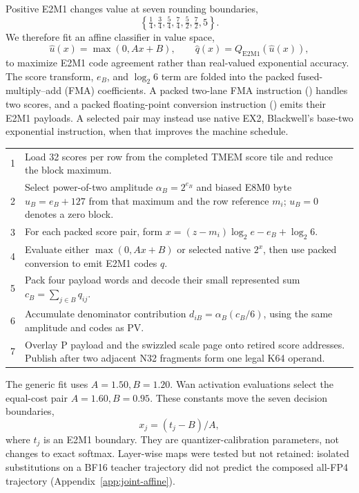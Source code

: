 Positive E2M1 changes value at seven rounding boundaries,
\begin{equation}
  \left\{\tfrac14,\tfrac34,\tfrac54,\tfrac74,
  \tfrac52,\tfrac72,5\right\}.
  \label{eq:e2m1-boundaries}
\end{equation}
We therefore fit an affine classifier in value space,
\begin{equation}
  \widehat u(x)=\max(0,Ax+B),\qquad
  \widehat q(x)=Q_{\mathrm{E2M1}}(\widehat u(x)),
  \label{eq:affine-code-map}
\end{equation}
to maximize E2M1 code agreement rather than real-valued exponential
accuracy. The score transform, $e_B$, and $\log_2 6$ term are folded into the
packed fused-multiply--add (FMA) coefficients. A packed two-lane FMA
instruction () handles two scores, and a packed floating-point
conversion instruction () emits their E2M1 payloads. A selected
pair may instead use native EX2, Blackwell's base-two exponential instruction,
when that improves the machine schedule.

\begin{algorithm}[H]
\caption{Direct MXFP4 probability production for one N32 score fragment}
\label{alg:direct-p-pack}
\small
\begin{tabularx}{\textwidth}{@{}rX@{}}
\toprule
1 & Load 32 scores per row from the completed TMEM score tile and reduce the block maximum. \\
2 & Select power-of-two amplitude $\alpha_B=2^{e_B}$ and biased E8M0 byte $u_B=e_B+127$ from that maximum and the row reference $m_i$; $u_B=0$ denotes a zero block. \\
3 & For each packed score pair, form $x=(z-m_i)\log_2 e-e_B+\log_2 6$. \\
4 & Evaluate either $\max(0,Ax+B)$ or selected native $2^x$, then use packed conversion to emit E2M1 codes $q$. \\
5 & Pack four payload words and decode their small represented sum $c_B=\sum_{j\in B}q_{ij}$. \\
6 & Accumulate denominator contribution $d_{iB}=\alpha_B(c_B/6)$, using the same amplitude and codes as PV. \\
7 & Overlay P payload and the swizzled scale page onto retired score addresses. Publish after two adjacent N32 fragments form one legal K64 operand. \\
\bottomrule
\end{tabularx}
\end{algorithm}

The generic  fit uses $A=1.50,B=1.20$. Wan activation evaluations
select the equal-cost pair $A=1.60,B=0.95$. These constants move the seven
decision boundaries,
\begin{equation}
  x_j=(t_j-B)/A,
  \label{eq:affine-log-boundaries}
\end{equation}
where $t_j$ is an E2M1 boundary. They are quantizer-calibration parameters,
not changes to exact softmax. Layer-wise maps were tested but not retained:
isolated substitutions on a BF16 teacher trajectory did not predict the
composed all-FP4 trajectory (Appendix~\ref{app:joint-affine}).

